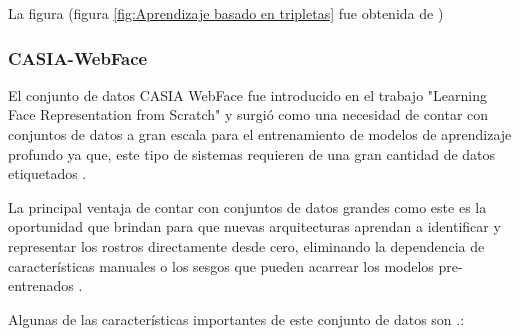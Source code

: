 La figura (figura \ref{fig:Aprendizaje basado en tripletas} fue obtenida de \cite{FaceNet_Paper})


\subsubsection{CASIA-WebFace}

El conjunto de datos CASIA WebFace fue introducido en el trabajo "Learning Face Representation from Scratch" y surgió como una necesidad de contar con conjuntos de datos a gran escala para el entrenamiento de modelos de aprendizaje profundo ya que, este tipo de sistemas requieren de una gran cantidad de datos etiquetados \cite{CASIA}.

La principal ventaja de contar con conjuntos de datos grandes como este es la oportunidad que brindan para que nuevas arquitecturas aprendan a identificar y representar los rostros directamente desde cero, eliminando la dependencia de características manuales o los sesgos que pueden acarrear los modelos pre-entrenados \cite{CASIA}.


Algunas de las características importantes de este conjunto de datos son \cite{CASIA}.:

